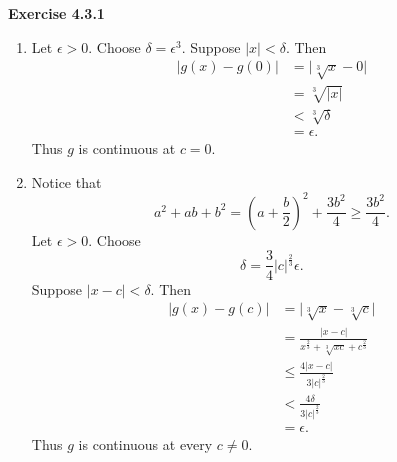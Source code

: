 \documentclass[12pt]{article}
\begin{document}
\textbf{Exercise 4.3.1}
\begin{enumerate}[label=(\alph*)]
    \item Let \( \epsilon > 0 \). Choose \( \delta = \epsilon^3 \). Suppose \( \vert x \vert < \delta \). Then
          \[
              \begin{split}
                  \vert g(x) - g(0) \vert & = \vert \sqrt[3]{x} - 0 \vert \\
                                          & = \sqrt[3]{\vert x \vert }    \\
                                          & < \sqrt[3]{\delta}            \\
                                          & = \epsilon.
              \end{split}
          \]
          Thus \( g \) is continuous at \( c = 0 \).

    \item Notice that
          \[
              a^2+ab+b^2
              =\left(a+\frac b2\right)^2+\frac{3b^2}{4}
              \ge\frac{3b^2}{4}.
          \]
          Let \( \epsilon > 0 \). Choose
          \[
              \delta = \frac{3}{4} \vert c \vert^{\frac{2}{3}} \epsilon.
          \]
          Suppose \( \vert x - c \vert < \delta \). Then
          \[
              \begin{split}
                  \vert g(x) - g(c) \vert & = \vert \sqrt[3]{x} - \sqrt[3]{c} \vert                                     \\
                                          & = \frac{\vert x-c \vert }{x^{\frac{2}{3}} + \sqrt[3]{xc} + c^{\frac{2}{3}}} \\
                                          & \leq \frac{4\vert x-c \vert }{3\vert c \vert^\frac{2}{3}}                   \\
                                          & < \frac{4\delta}{3\vert c \vert^{\frac{2}{3}}}                              \\
                                          & = \epsilon.
              \end{split}
          \]
          Thus \( g \) is continuous at every \( c \neq 0 \).

\end{enumerate}
\end{document}
